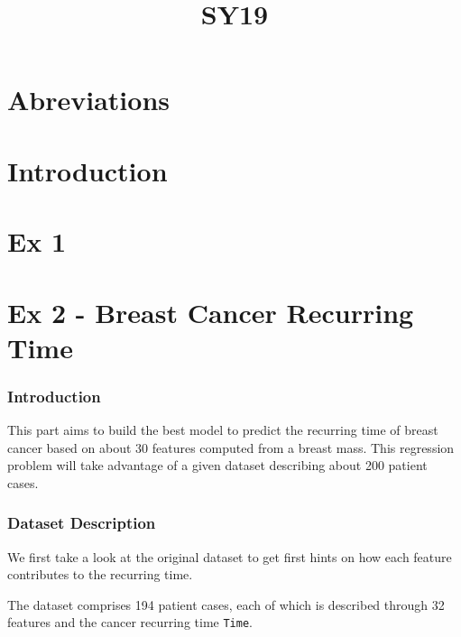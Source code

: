 \documentclass[]{report}
\title{SY19}
\author{}
\begin{document}
	

\maketitle

\part{Abreviations}
	

\begin{abstract}

\end{abstract}

\part{Introduction}

\part{Ex 1}

\part{Ex 2 - Breast Cancer Recurring Time}

\section{Introduction}
This part aims to build the best model to predict the recurring time of breast cancer based on about 30 features computed from a breast mass.  This regression problem will take advantage of a given dataset describing about 200 patient cases.

\section{Dataset Description}
We first take a look at the original dataset to get first hints on how each feature contributes to the recurring time.

The dataset comprises 194 patient cases, each of which is described through 32 features and the cancer recurring time \texttt{Time}.
\end{document}
